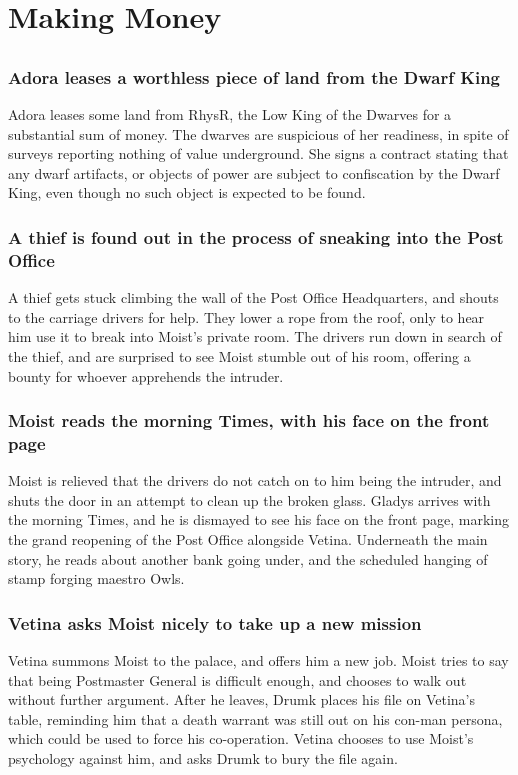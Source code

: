 \section{Making Money}


\subsection{}
\subsubsection{\Gls{Adora} leases a worthless piece of land from the Dwarf King}
\Gls{Adora} leases some land from \Gls{RhysR}, the Low King of the Dwarves for a substantial sum of
money. The dwarves are suspicious of her readiness, in spite of surveys reporting nothing of value
underground. She signs a contract stating that any dwarf artifacts, or objects of power are subject
to confiscation by the Dwarf King, even though no such object is expected to be found.

\subsubsection{A thief is found out in the process of sneaking into the Post Office}
A thief gets stuck climbing the wall of the Post Office Headquarters, and shouts to the carriage
drivers for help. They lower a rope from the roof, only to hear him use it to break into
\Gls{Moist}'s private room. The drivers run down in search of the thief, and are surprised to see
\Gls{Moist} stumble out of his room, offering a bounty for whoever apprehends the intruder.

\subsubsection{\Gls{Moist} reads the morning Times, with his face on the front page}
\Gls{Moist} is relieved that the drivers do not catch on to him being the intruder, and shuts the
door in an attempt to clean up the broken glass. \Gls{Gladys} arrives with the morning Times, and
he is dismayed to see his face on the front page, marking the grand reopening of the Post Office
alongside \Gls{Vetina}. Underneath the main story, he reads about another bank going under, and
the scheduled hanging of stamp forging maestro \Gls{Owls}.

\subsubsection{\Gls{Vetina} asks \Gls{Moist} nicely to take up a new mission}
\Gls{Vetina} summons \Gls{Moist} to the palace, and offers him a new job. \Gls{Moist} tries to say
that being Postmaster General is difficult enough, and chooses to walk out without further argument.
After he leaves, \Gls{Drumk} places his file on \Gls{Vetina}'s table, reminding him that a death
warrant was still out on his con-man persona, which could be used to force his co-operation.
\Gls{Vetina} chooses to use \Gls{Moist}'s psychology against him, and asks \Gls{Drumk} to bury the
file again.

